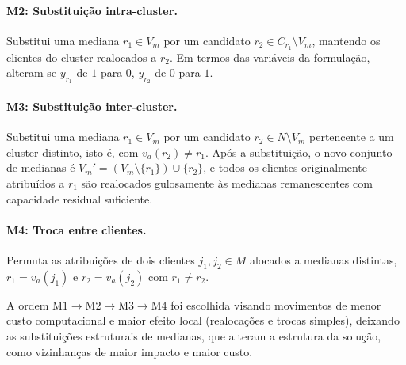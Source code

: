 \documentclass[a4paper,11pt]{article}
\begin{document}
\paragraph{M2: Substituição intra-cluster.} Substitui uma mediana $r_1 \in V_m$ por um candidato $r_2 \in C_{r_1} \setminus V_m$, mantendo os clientes do cluster realocados a $r_2$. Em termos das variáveis da formulação, alteram-se $y_{r_1}$ de $1$ para $0$, $y_{r_2}$ de $0$ para $1$. 


\paragraph{M3: Substituição inter-cluster.} Substitui uma mediana $r_1 \in V_m$ por um candidato $r_2 \in N \setminus V_m$ pertencente a um cluster distinto, isto é, com $v_a(r_2) \neq r_1$. Após a substituição, o novo conjunto de medianas é $V_m' = (V_m \setminus \{r_1\}) \cup \{r_2\}$, e todos os clientes originalmente atribuídos a $r_1$ são realocados gulosamente às medianas remanescentes com capacidade residual suficiente. 


\paragraph{M4: Troca entre clientes.} Permuta as atribuições de dois clientes $j_1, j_2 \in M$ alocados a medianas distintas, $r_1 = v_a(j_1)$ e $r_2 = v_a(j_2)$ com $r_1 \neq r_2$. 

A ordem $\mathrm{M1} \to \mathrm{M2} \to \mathrm{M3} \to \mathrm{M4}$ foi escolhida visando movimentos de menor custo computacional e maior efeito local (realocações e trocas simples), deixando as substituições estruturais de medianas, que alteram a estrutura da solução, como vizinhanças de maior impacto e maior custo. 


\end{document}
